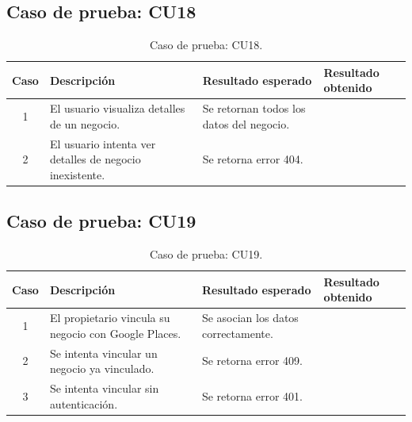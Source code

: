 
\subsection{Caso de prueba: CU18}

\begin{table}[H]
\centering
\label{tab:cu18_white_test}
\renewcommand{\arraystretch}{1.3}
\begin{tabular}{|c|p{5cm}|p{6cm}|p{2.5cm}|}
\hline
\rowcolor[RGB]{217,217,217}
\textbf{Caso} & \textbf{Descripción} & \textbf{Resultado esperado} & \textbf{Resultado obtenido} \\
\hline

1 &
El usuario visualiza detalles de un negocio. &
Se retornan todos los datos del negocio. &
 \\
\hline

2 &
El usuario intenta ver detalles de negocio inexistente. &
Se retorna error 404. &
 \\
\hline

\end{tabular}
\caption{Caso de prueba: CU18.}
\end{table}


\subsection{Caso de prueba: CU19}

\begin{table}[H]
\centering
\label{tab:cu19_white_test}
\renewcommand{\arraystretch}{1.3}
\begin{tabular}{|c|p{5cm}|p{6cm}|p{2.5cm}|}
\hline
\rowcolor[RGB]{217,217,217}
\textbf{Caso} & \textbf{Descripción} & \textbf{Resultado esperado} & \textbf{Resultado obtenido} \\
\hline

1 &
El propietario vincula su negocio con Google Places. &
Se asocian los datos correctamente. &
 \\
\hline

2 &
Se intenta vincular un negocio ya vinculado. &
Se retorna error 409. &
 \\
\hline

3 &
Se intenta vincular sin autenticación. &
Se retorna error 401. &
 \\
\hline

\end{tabular}
\caption{Caso de prueba: CU19.}
\end{table}

